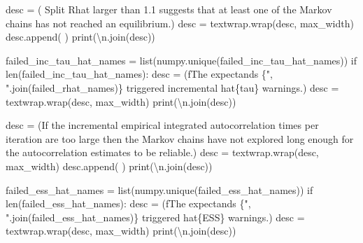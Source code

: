 \documentclass[
  letterpaper,
  DIV=11,
  numbers=noendperiod]{scrartcl}
\newenvironment{Shaded}{\begin{snugshade}}{\end{snugshade}}
\newcommand{\BuiltInTok}[1]{\textcolor[rgb]{0.00,0.23,0.31}{#1}}
\newcommand{\CharTok}[1]{\textcolor[rgb]{0.13,0.47,0.30}{#1}}
\newcommand{\ControlFlowTok}[1]{\textcolor[rgb]{0.00,0.23,0.31}{#1}}
\newcommand{\NormalTok}[1]{\textcolor[rgb]{0.00,0.23,0.31}{#1}}
\newcommand{\OperatorTok}[1]{\textcolor[rgb]{0.37,0.37,0.37}{#1}}
\newcommand{\SpecialCharTok}[1]{\textcolor[rgb]{0.37,0.37,0.37}{#1}}
\newcommand{\SpecialStringTok}[1]{\textcolor[rgb]{0.13,0.47,0.30}{#1}}
\newcommand{\StringTok}[1]{\textcolor[rgb]{0.13,0.47,0.30}{#1}}
\begin{document}
\begin{Shaded}
\begin{Highlighting}[]
\NormalTok{    desc }\OperatorTok{=}\NormalTok{ (}\StringTok{\textquotesingle{}  Split Rhat larger than 1.1 suggests that at \textquotesingle{}}
            \StringTok{\textquotesingle{}least one of the Markov chains has not reached \textquotesingle{}}
            \StringTok{\textquotesingle{}an equilibrium.\textquotesingle{}}\NormalTok{)}
\NormalTok{    desc }\OperatorTok{=}\NormalTok{ textwrap.wrap(desc, max\_width)}
\NormalTok{    desc.append(}\StringTok{\textquotesingle{} \textquotesingle{}}\NormalTok{)}
    \BuiltInTok{print}\NormalTok{(}\StringTok{\textquotesingle{}}\CharTok{\textbackslash{}n}\StringTok{\textquotesingle{}}\NormalTok{.join(desc))}

\NormalTok{  failed\_inc\_tau\_hat\_names }\OperatorTok{=} \BuiltInTok{list}\NormalTok{(numpy.unique(failed\_inc\_tau\_hat\_names))}
  \ControlFlowTok{if} \BuiltInTok{len}\NormalTok{(failed\_inc\_tau\_hat\_names):}
\NormalTok{    desc }\OperatorTok{=}\NormalTok{ (}\SpecialStringTok{f\textquotesingle{}The expectands }\SpecialCharTok{\{}\StringTok{", "}\SpecialCharTok{.}\NormalTok{join(failed\_rhat\_names)}\SpecialCharTok{\}}\SpecialStringTok{ \textquotesingle{}}
             \StringTok{\textquotesingle{}triggered incremental hat}\SpecialCharTok{\{tau\}}\StringTok{ warnings.\textquotesingle{}}\NormalTok{)}
\NormalTok{    desc }\OperatorTok{=}\NormalTok{ textwrap.wrap(desc, max\_width)}
    \BuiltInTok{print}\NormalTok{(}\StringTok{\textquotesingle{}}\CharTok{\textbackslash{}n}\StringTok{\textquotesingle{}}\NormalTok{.join(desc))}

\NormalTok{    desc }\OperatorTok{=}\NormalTok{ (}\StringTok{\textquotesingle{}If the incremental empirical integrated autocorrelation \textquotesingle{}}
            \StringTok{\textquotesingle{}times per iteration are too large then the Markov \textquotesingle{}}
            \StringTok{\textquotesingle{}chains have not explored long enough for the \textquotesingle{}}
            \StringTok{\textquotesingle{}autocorrelation estimates to be reliable.\textquotesingle{}}\NormalTok{)}
\NormalTok{    desc }\OperatorTok{=}\NormalTok{ textwrap.wrap(desc, max\_width)}
\NormalTok{    desc.append(}\StringTok{\textquotesingle{} \textquotesingle{}}\NormalTok{)}
    \BuiltInTok{print}\NormalTok{(}\StringTok{\textquotesingle{}}\CharTok{\textbackslash{}n}\StringTok{\textquotesingle{}}\NormalTok{.join(desc))}

\NormalTok{  failed\_ess\_hat\_names }\OperatorTok{=} \BuiltInTok{list}\NormalTok{(numpy.unique(failed\_ess\_hat\_names))}
  \ControlFlowTok{if} \BuiltInTok{len}\NormalTok{(failed\_ess\_hat\_names):}
\NormalTok{    desc }\OperatorTok{=}\NormalTok{ (}\SpecialStringTok{f\textquotesingle{}The expectands }\SpecialCharTok{\{}\StringTok{", "}\SpecialCharTok{.}\NormalTok{join(failed\_ess\_hat\_names)}\SpecialCharTok{\}}\SpecialStringTok{ \textquotesingle{}}
             \StringTok{\textquotesingle{}triggered hat}\SpecialCharTok{\{ESS\}}\StringTok{ warnings.\textquotesingle{}}\NormalTok{)}
\NormalTok{    desc }\OperatorTok{=}\NormalTok{ textwrap.wrap(desc, max\_width)}
    \BuiltInTok{print}\NormalTok{(}\StringTok{\textquotesingle{}}\CharTok{\textbackslash{}n}\StringTok{\textquotesingle{}}\NormalTok{.join(desc))}


\end{Highlighting}
\end{Shaded}
\end{document}
